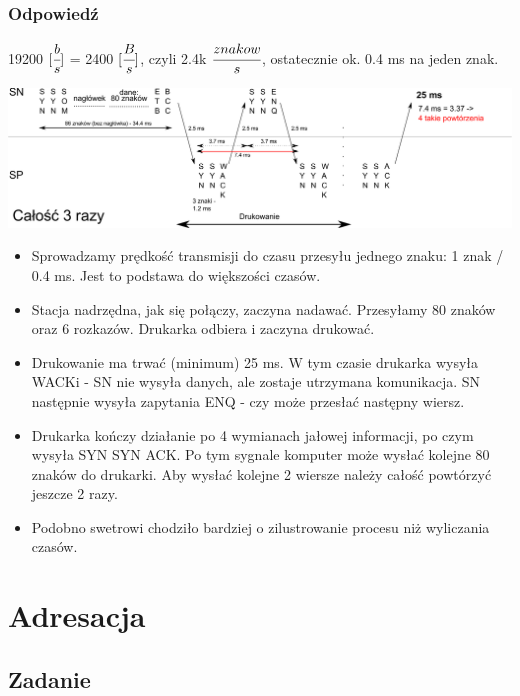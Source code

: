 		\subsubsection{Odpowiedź}
			19200 $ [\cfrac{b}{s}] $ = 2400 $ [\cfrac{B}{s}] $, czyli 2.4k $ \cfrac{znakow}{s} $, ostatecznie ok. 0.4 ms na jeden znak.
			\begin{center}
				\includegraphics[width=16.0cm]{./images/zadanie13.pdf}
			\end{center}
			\begin{itemize}
				\item Sprowadzamy prędkość transmisji do czasu przesyłu jednego znaku: 1 znak / 0.4 ms. Jest to podstawa do większości czasów.
				\item Stacja nadrzędna, jak się połączy, zaczyna nadawać. Przesyłamy 80 znaków oraz 6 rozkazów. Drukarka odbiera i zaczyna drukować.
				\item Drukowanie ma trwać (minimum) 25 ms. W tym czasie drukarka wysyła WACKi - SN nie wysyła danych, ale zostaje utrzymana komunikacja. SN następnie wysyła zapytania ENQ - czy może przesłać następny wiersz.
				\item Drukarka kończy działanie po 4 wymianach jałowej informacji, po czym wysyła SYN SYN ACK. Po tym sygnale komputer może wysłać kolejne 80 znaków do drukarki. Aby wysłać kolejne 2 wiersze należy całość powtórzyć jeszcze 2 razy.
				\item Podobno swetrowi chodziło bardziej o zilustrowanie procesu niż wyliczania czasów.
			\end{itemize}
			
			
\newpage
\section{Adresacja}
	\subsection{Zadanie}
